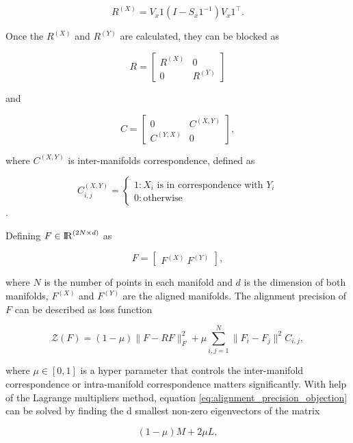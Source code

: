   \begin{equation}
    R^{(X)}=V_x1(I-S_x1^{-1})V_x1^\intercal.
  \end{equation}

  Once the $R^{(X)}$ and $R^{(Y)}$ are calculated, they can be blocked as
  
  \[R= \begin{bmatrix}
        R^{(X)} & 0 \\
        0 & R^{(Y)}
      \end{bmatrix}\]

  and

  \[C=\begin{bmatrix}
        0 & C^{(X,Y)}\\
        C^{(Y,X)} & 0
      \end{bmatrix},\]

  where $C^{(X,Y)}$ is inter-manifolds correspondence, defined as

  \[C_{i,j}^{(X,Y)}=\begin{cases}
                      1 : X_i\text{ is in correspondence with }Y_i\\
                      0 : \text{otherwise}
                    \end{cases}\].

  Defining $F\in {\rm I\!R}^{(2N\times d)}$ as

  \[F=\begin{bmatrix}
        F^{(X)}\
        F^{(Y)}
      \end{bmatrix},\]

  where $N$ is the number of points in each manifold and $d$ is the dimension of both manifolds, $F^{(X)}$ and $F^{(Y)}$ are the aligned manifolds. The alignment precision of $F$ can be described as loss function

  \begin{equation}\label{eq:alignment_precision_objection}
    \mathcal{Z}(F)=(1-\mu )\|F-RF\|^2_F+\mu\sum_{i,j=1}^N\|F_i-F_j\|^2C_{i,j},
  \end{equation}

  where $\mu\in[0,1]$ is a hyper parameter that controls the inter-manifold correspondence or intra-manifold correspondence matters significantly. With help of the Lagrange multipliers method, equation \eqref{eq:alignment_precision_objection} can be solved by finding the d smallest non-zero eigenvectors of the matrix

  \begin{equation}
    (1-\mu)M+2\mu L,
  \end{equation}

